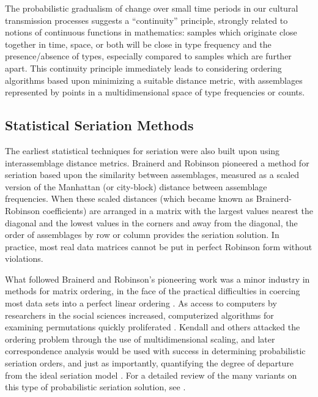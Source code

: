 \documentclass[graybox,natbib]{svmult}
\begin{document}
The probabilistic gradualism of change over small time periods in our
cultural transmission processes suggests a ``continuity'' principle,
strongly related to notions of continuous functions in mathematics:
samples which originate close together in time, space, or both will be
close in type frequency and the presence/absence of types, especially
compared to samples which are further apart. This continuity principle
immediately leads to considering ordering algorithms based upon
minimizing a suitable distance metric, with assemblages represented by
points in a multidimensional space of type frequencies or counts.

\subsection{Statistical Seriation
Methods}\label{statistical-seriation-methods}

The earliest statistical techniques for seriation were also built upon
using interassemblage distance metrics. Brainerd and Robinson
\citep{Brainerd1951, Robinson1951} pioneered a method for seriation
based upon the similarity between assemblages, measured as a scaled
version of the Manhattan (or city-block) distance between assemblage
frequencies. When these scaled distances (which became known as
Brainerd-Robinson coefficients) are arranged in a matrix with the
largest values nearest the diagonal and the lowest values in the corners
and away from the diagonal, the order of assemblages by row or column
provides the seriation solution. In practice, most real data matrices
cannot be put in perfect Robinson form without violations.

What followed Brainerd and Robinson's pioneering work was a minor
industry in methods for matrix ordering, in the face of the practical
difficulties in coercing most data sets into a perfect linear ordering
\citep[e.g.,][]{dempsey1963statistical, Kendall1963, Matthews1963, Bordaz1970aa, Gardin1970, Kendall1970, Kendall1971}.
As access to computers by researchers in the social sciences increased,
computerized algorithms for examining permutations quickly proliferated
\citep{Ascher1963, craytor1968refinements, Kuzara1966}. Kendall
\citeyearpar{Kendall1969} and others attacked the ordering problem
through the use of multidimensional scaling, and later correspondence
analysis would be used with success in determining probabilistic
seriation orders, and just as importantly, quantifying the degree of
departure from the ideal seriation model \citep{Smith2005}. For a
detailed review of the many variants on this type of probabilistic
seriation solution, see \citep{Marquardt:1978aa}.
\end{document}
